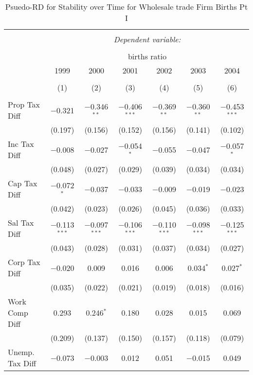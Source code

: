 
\begin{table}[!htbp] \centering 
  \caption{Psuedo-RD for Stability over Time for  Wholesale trade Firm Births Pt I} 
  \label{42year} 
\small 
\begin{tabular}{@{\extracolsep{5pt}}lcccccc} 
\\[-1.8ex]\hline 
\hline \\[-1.8ex] 
 & \multicolumn{6}{c}{\textit{Dependent variable:}} \\ 
\cline{2-7} 
\\[-1.8ex] & \multicolumn{6}{c}{births ratio} \\ 
 & 1999 & 2000 & 2001 & 2002 & 2003 & 2004 \\ 
\\[-1.8ex] & (1) & (2) & (3) & (4) & (5) & (6)\\ 
\hline \\[-1.8ex] 
 Prop Tax Diff & $-$0.321 & $-$0.346$^{**}$ & $-$0.406$^{***}$ & $-$0.369$^{**}$ & $-$0.360$^{**}$ & $-$0.453$^{***}$ \\ 
  & (0.197) & (0.156) & (0.152) & (0.156) & (0.141) & (0.102) \\ 
  Inc Tax Diff & $-$0.008 & $-$0.027 & $-$0.054$^{*}$ & $-$0.055 & $-$0.047 & $-$0.057$^{*}$ \\ 
  & (0.048) & (0.027) & (0.029) & (0.039) & (0.034) & (0.034) \\ 
  Cap Tax Diff & $-$0.072$^{*}$ & $-$0.037 & $-$0.033 & $-$0.009 & $-$0.019 & $-$0.023 \\ 
  & (0.042) & (0.023) & (0.026) & (0.045) & (0.036) & (0.033) \\ 
  Sal Tax Diff & $-$0.113$^{***}$ & $-$0.097$^{***}$ & $-$0.106$^{***}$ & $-$0.110$^{***}$ & $-$0.098$^{***}$ & $-$0.125$^{***}$ \\ 
  & (0.043) & (0.028) & (0.031) & (0.037) & (0.034) & (0.027) \\ 
  Corp Tax Diff & $-$0.020 & 0.009 & 0.016 & 0.006 & 0.034$^{*}$ & 0.027$^{*}$ \\ 
  & (0.035) & (0.022) & (0.021) & (0.019) & (0.018) & (0.016) \\ 
  Work Comp Diff & 0.293 & 0.246$^{*}$ & 0.180 & 0.028 & 0.015 & 0.069 \\ 
  & (0.209) & (0.137) & (0.150) & (0.157) & (0.118) & (0.079) \\ 
  Unemp. Tax Diff & $-$0.073 & $-$0.003 & 0.012 & 0.051 & $-$0.015 & 0.049 \\ 

\end{tabular}
\end{table}
